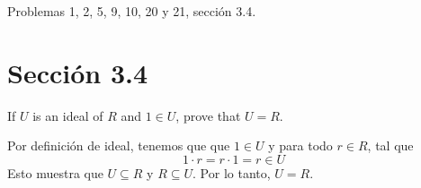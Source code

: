 




Problemas  1, 2, 5, 9, 10, 20 y 21, sección 3.4.

\section{Sección 3.4}

\begin{problema}[Problema 1]
    If $U$ is an ideal of $R$ and $1\in U$, prove that $U= R$.
    \begin{dem}
        Por definición de ideal, tenemos que que $1\in U$ y para todo $r\in R$, tal que 
        $$1\cdot r= r\cdot 1 = r\in U$$
        Esto muestra que $U\subseteq R$ y $R\subseteq U$. Por lo tanto, $U=R$.
    \end{dem}
\end{problema}

